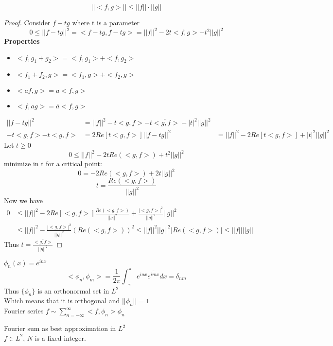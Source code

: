 \documentclass[answers,12pt,addpoints]{exam}
\begin{document}
\begin{theorem}
    $$||<f,g>|| \leq ||f|| \cdot ||g||$$
    \begin{proof}
        Consider $f-tg$ where t is a parameter
        $$0 \leq ||f-tg||^2 = <f-tg, f-tg> = ||f||^2 - 2t<f,g> + t^2||g||^2$$
        \textbf{Properties}
        \begin{itemize}
            \item $<f,g_1 +g_2> = <f,g_1> + <f,g_2>$
            \item $<f_1 + f_2, g> = <f_1, g> + <f_2, g>$
            \item $<af, g> = a<f,g>$
            \item $<f, ag> = \overline{a}<f,g>$
        \end{itemize}
        \begin{align*}
            ||f-tg||^2 &= ||f||^2 - t <g,f> - \overline{t<g,f>} + |t|^2 ||g||^2\\
            - t <g,f> - \overline{t<g,f>} &= 2Re[t<g,f>]
            ||f-tg||^2 &= ||f||^2 - 2Re[t<g,f>] + |t|^2 ||g||^2
        \end{align*}
        Let $t \geq 0$\\
        $$0 \leq ||f||^2 - 2t Re(<g,f>) + t^2 ||g||^2$$
        minimize in t for a critical point:
        $$0 = -2Re(<g,f>) + 2t ||g||^2$$
        $$t = \frac{Re(<g,f>)}{||g||^2}$$
        Now we have 
        \begin{align*}
            0 &\leq ||f||^2 - 2Re[<g,f>] \frac{Re(<g,f>)}{||g||^2} + \frac{|<g,f>|^2}{||g||^2} ||g||^2\\
            & \leq ||f||^2 - \frac{|<g,f>|^2}{||g||^2}
            (Re(<g,f>))^2 \leq ||f||^2 ||g||^2
            |Re(<g,f>)| \leq ||f|| ||g||
        \end{align*}
        Thus $t = \frac{\overline{<g,f>}}{||g||^2}$
    \end{proof}
    $\phi_n(x) = e^{inx}$\\
    $$< \phi_n, \phi_m> = \frac{1}{2\pi} \int_{-\pi}^{\pi} e^{inx} \overline{e^{imx}} dx = \delta_{nm}$$
    Thus $\{\phi_n\}$ is an orthonormal set in $L^2$\\
    Which means that it is orthogonal and $||\phi_n|| = 1$\\
    Fourier series $f \sim \sum_{n=-\infty}^{\infty} <f, \phi_n> \phi_n$\\
    \begin{lemma}
        Fourier sum as best approximation in $L^2$\\
        $f \in L^2$, $N$ is a fixed integer. \\

\end{lemma}
\end{theorem}
\end{document}

